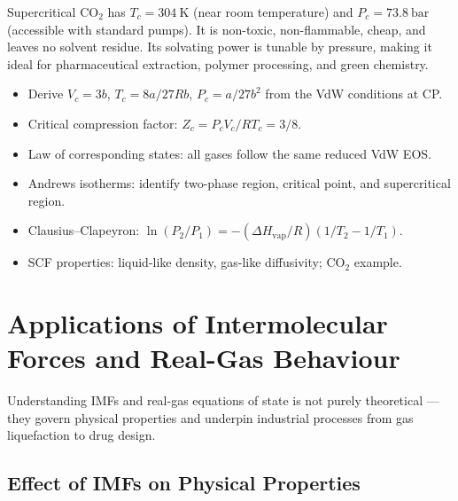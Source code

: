 \documentclass[12pt,a4paper]{article}
\begin{document}
\begin{tcolorbox}[masonbox, title={Why \texorpdfstring{$\mathrm{sc}$-$\mathrm{CO_2}$}{sc-CO2} is the Industrial SCF of Choice}]
Supercritical $\mathrm{CO_2}$ has $T_c=304\ \mathrm{K}$ (near room temperature) and $P_c=73.8\ \mathrm{bar}$ (accessible with standard pumps). It is non-toxic, non-flammable, cheap, and leaves no solvent residue. Its solvating power is tunable by pressure, making it ideal for pharmaceutical extraction, polymer processing, and green chemistry.
\end{tcolorbox}

\begin{tcolorbox}[exambox, title={Exam Points (Section 4)}]
\begin{itemize}[leftmargin=*, itemsep=2pt, topsep=2pt]
  \item Derive $V_c=3b$, $T_c=8a/27Rb$, $P_c=a/27b^2$ from the VdW conditions at CP.
  \item Critical compression factor: $Z_c = P_cV_c/RT_c = 3/8$.
  \item Law of corresponding states: all gases follow the same reduced VdW EOS.
  \item Andrews isotherms: identify two-phase region, critical point, and supercritical region.
  \item Clausius--Clapeyron: $\ln(P_2/P_1) = -(\Delta H_{\mathrm{vap}}/R)(1/T_2 - 1/T_1)$.
  \item SCF properties: liquid-like density, gas-like diffusivity; CO$_2$ example.
\end{itemize}
\end{tcolorbox}

\section{Applications of Intermolecular Forces and Real-Gas Behaviour}

\begin{tcolorbox}[defbox]
Understanding IMFs and real-gas equations of state is not purely theoretical --- they govern physical properties and underpin industrial processes from gas liquefaction to drug design.
\end{tcolorbox}

\subsection{Effect of IMFs on Physical Properties}
\end{document}
